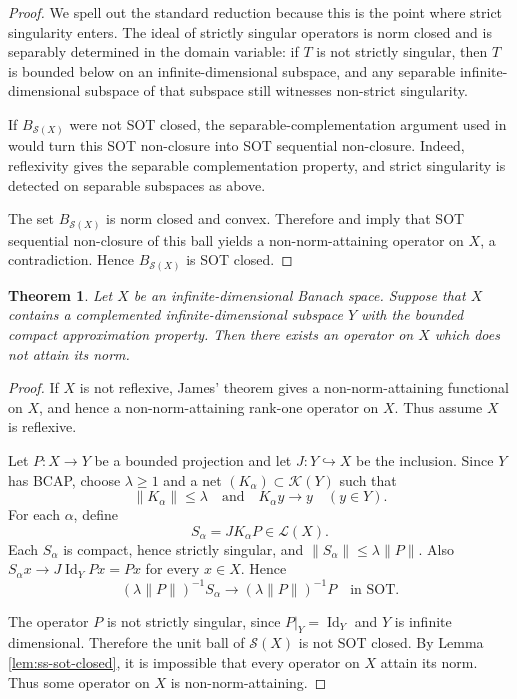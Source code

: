 \documentclass[11pt]{amsart}
\newtheorem{theorem}{Theorem}
\newcommand{\Lin}{\mathcal L}
\newcommand{\Id}{\operatorname{Id}}
\newcommand{\SSing}{\mathcal S}
\newcommand{\Comp}{\mathcal K}
\newcommand{\Ball}{B}
\begin{document}
\begin{proof}
We spell out the standard reduction because this is the point where strict
singularity enters.  The ideal of strictly singular operators is norm closed
and is separably determined in the domain variable: if \(T\) is not strictly
singular, then \(T\) is bounded below on an infinite-dimensional subspace, and
any separable infinite-dimensional subspace of that subspace still witnesses
non-strict singularity.

If \(\Ball_{\SSing(X)}\) were not SOT closed, the separable-complementation
argument used in \cite[Lemma 3.5]{DJM} would turn this SOT non-closure into
SOT sequential non-closure.  Indeed, reflexivity gives the separable
complementation property, and strict singularity is detected on separable
subspaces as above.

The set \(\Ball_{\SSing(X)}\) is norm closed and convex.  Therefore
\cite[Lemma 3.4]{DJM} and \cite[Theorem A]{DJM} imply that SOT sequential
non-closure of this ball yields a non-norm-attaining operator on \(X\), a
contradiction.  Hence \(\Ball_{\SSing(X)}\) is SOT closed.
\end{proof}

\begin{theorem}\label{thm:complemented-bcap}
Let \(X\) be an infinite-dimensional Banach space.  Suppose that \(X\) contains
a complemented infinite-dimensional subspace \(Y\) with the bounded compact
approximation property.  Then there exists an operator on \(X\) which does not
attain its norm.
\end{theorem}

\begin{proof}
If \(X\) is not reflexive, James' theorem gives a non-norm-attaining functional
on \(X\), and hence a non-norm-attaining rank-one operator on \(X\).  Thus
assume \(X\) is reflexive.

Let \(P:X\to Y\) be a bounded projection and let \(J:Y\hookrightarrow X\) be
the inclusion.  Since \(Y\) has BCAP, choose \(\lambda\geq 1\) and a net
\((K_\alpha)\subset\Comp(Y)\) such that
\[
\|K_\alpha\|\leq \lambda
\quad\text{and}\quad
K_\alpha y\to y\quad (y\in Y).
\]
For each \(\alpha\), define
\[
S_\alpha=J K_\alpha P\in\Lin(X).
\]
Each \(S_\alpha\) is compact, hence strictly singular, and
\(\|S_\alpha\|\leq \lambda\|P\|\).  Also \(S_\alpha x\to J\Id_Y P x=Px\) for
every \(x\in X\).  Hence
\[
(\lambda\|P\|)^{-1}S_\alpha
\longrightarrow
(\lambda\|P\|)^{-1}P
\quad\text{in SOT}.
\]

The operator \(P\) is not strictly singular, since \(P|_Y=\Id_Y\) and \(Y\) is
infinite dimensional.  Therefore the unit ball of \(\SSing(X)\) is not SOT
closed.  By Lemma \ref{lem:ss-sot-closed}, it is impossible that every operator
on \(X\) attain its norm.  Thus some operator on \(X\) is non-norm-attaining.
\end{proof}
\end{document}
